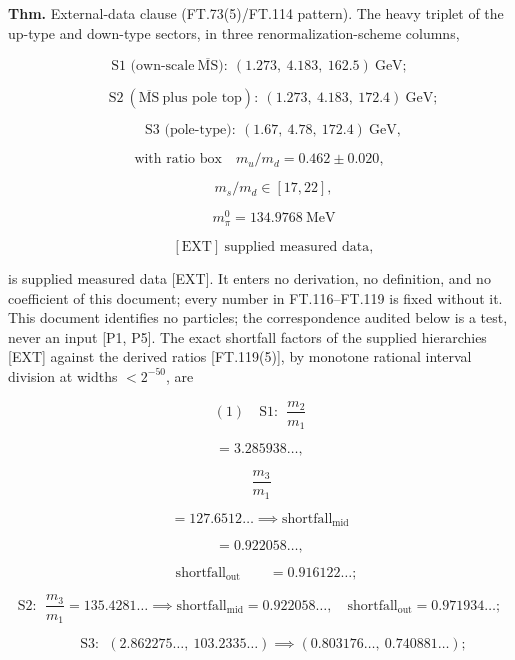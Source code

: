 \begin{theorem}\label{tag:FT-120}
\textbf{Thm.} External-data clause (FT.73(5)/FT.114 pattern). The heavy triplet of the up-type and down-type sectors, in three renormalization-scheme columns,

\[
\text{S1 (own-scale}\ \overline{\mathrm{MS}}\text{)}:\ (1.273,\ 4.183,\ 162.5)\ \mathrm{GeV};
\]

\[
\qquad \text{S2}\ (\overline{\mathrm{MS}}\ \text{plus pole top}):\ (1.273,\ 4.183,\ 172.4)\ \mathrm{GeV};
\]

\[
\qquad \text{S3 (pole-type)}:\ (1.67,\ 4.78,\ 172.4)\ \mathrm{GeV},
\]

\[
\text{with ratio box}\quad m_u/m_d=0.462\pm0.020,
\]

\[
\qquad m_s/m_d\in[17,22],
\]

\[
\qquad m^0_{\pi}=134.9768\ \mathrm{MeV}
\]

\[
\qquad [\text{EXT}]\ \text{supplied measured data},
\]

is supplied measured data [EXT]. It enters no derivation, no definition, and no coefficient of this document; every number in FT.116–FT.119 is fixed without it. This document identifies no particles; the correspondence audited below is a test, never an input [P1, P5]. The exact shortfall factors of the supplied hierarchies [EXT] against the derived ratios [FT.119(5)], by monotone rational interval division at widths $<2^{-50}$, are

\[
(1)\quad\text{S1}:\ \ \frac{m_2}{m_1}
\]

\[
= 3.285938\ldots,
\]

\[
\ \frac{m_3}{m_1}
\]

\[
= 127.6512\ldots\implies\text{shortfall}_{\mathrm{mid}}
\]

\[
= 0.922058\ldots,
\]

\[
\quad\text{shortfall}_{\mathrm{out}}\qquad = 0.916122\ldots;
\]

\[
\text{S2}:\ \ \frac{m_3}{m_1}=135.4281\ldots\implies\text{shortfall}_{\mathrm{mid}}=0.922058\ldots,\quad\text{shortfall}_{\mathrm{out}}=0.971934\ldots;
\]

\[
\qquad \text{S3}:\ \ (2.862275\ldots,\ 103.2335\ldots)\implies(0.803176\ldots,\ 0.740881\ldots);
\]


\end{theorem}
